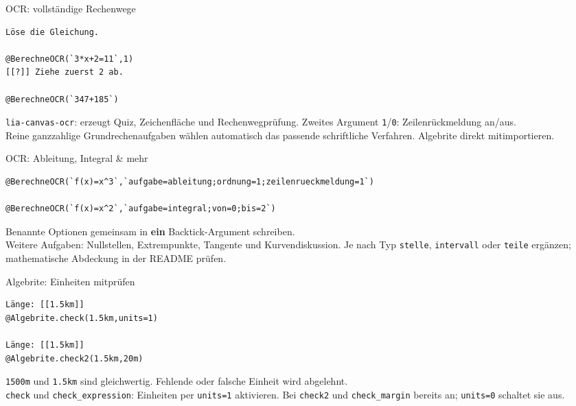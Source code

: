 \documentclass[a4paper,landscape,9pt]{extarticle}
\newcommand{\prevsm}[1]{{\footnotesize\color{muted} #1}}
\begin{document}
\begingroup
\setlength{\multicolsep}{2pt}
\lstset{breakatwhitespace=false,breakautoindent=false}
\begin{multicols}{3}

\begin{extracard}{OCR: vollständige Rechenwege}
\begin{lstlisting}[language=lia]
Löse die Gleichung.

@BerechneOCR(`3*x+2=11`,1)
[[?]] Ziehe zuerst 2 ab.

@BerechneOCR(`347+185`)
\end{lstlisting}
\tcblower
\prevsm{\texttt{lia-canvas-ocr}: erzeugt Quiz, Zeichenfläche und Rechenwegprüfung. Zweites Argument \texttt{1}/\texttt{0}: Zeilenrückmeldung an/aus.\\[2pt]
Reine ganzzahlige Grundrechenaufgaben wählen automatisch das passende schriftliche Verfahren. Algebrite direkt mitimportieren.}
\end{extracard}

\begin{extracard}{OCR: Ableitung, Integral \& mehr}
\begin{lstlisting}[language=lia]
@BerechneOCR(`f(x)=x^3`,`aufgabe=ableitung;ordnung=1;zeilenrueckmeldung=1`)

@BerechneOCR(`f(x)=x^2`,`aufgabe=integral;von=0;bis=2`)
\end{lstlisting}
\tcblower
\prevsm{Benannte Optionen gemeinsam in \textbf{ein} Backtick-Argument schreiben.\\[2pt]
Weitere Aufgaben: Nullstellen, Extrempunkte, Tangente und Kurvendiskussion. Je nach Typ \texttt{stelle}, \texttt{intervall} oder \texttt{teile} ergänzen; mathematische Abdeckung in der README prüfen.}
\end{extracard}

\begin{extracard}{Algebrite: Einheiten mitprüfen}
\begin{lstlisting}[language=lia]
Länge: [[1.5km]]
@Algebrite.check(1.5km,units=1)

Länge: [[1.5km]]
@Algebrite.check2(1.5km,20m)
\end{lstlisting}
\tcblower
\prevsm{\texttt{1500m} und \texttt{1.5km} sind gleichwertig. Fehlende oder falsche Einheit wird abgelehnt.\\[2pt]
\texttt{check} und \texttt{check\_expression}: Einheiten per \texttt{units=1} aktivieren. Bei \texttt{check2} und \texttt{check\_margin} bereits an; \texttt{units=0} schaltet sie aus.}
\end{extracard}


\end{multicols}
\end{document}
